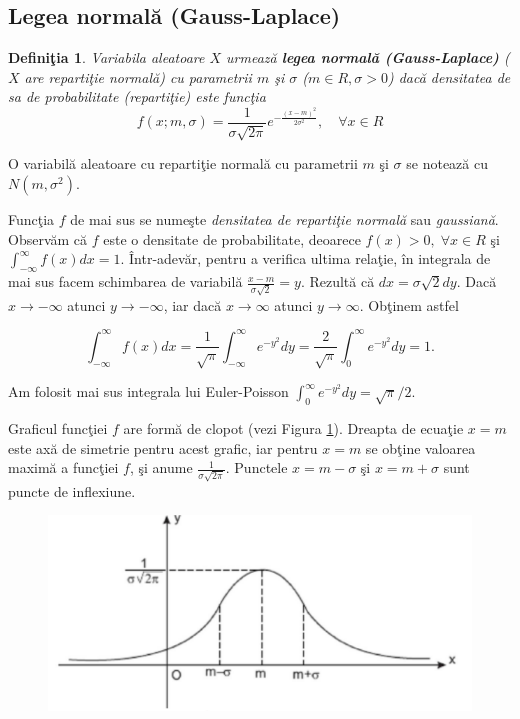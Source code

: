 \documentclass[12pt]{article}
\newtheorem{definitie}{Definiţia}
\begin{document}
\subsection*{Legea normală (Gauss-Laplace)}

\begin{definitie}
	Variabila aleatoare $X$ urmează \textbf{legea normală (Gauss-Laplace)} ($X$ are repartiţie normală) cu parametrii $m$ şi $\sigma$ ($m \in R, \sigma > 0$) dacă densitatea de sa de probabilitate (repartiţie) este funcţia
	\begin{equation}
		f(x;m, \sigma) = \frac{1}{\sigma\sqrt{2\pi}} e^{-\frac{(x-m)^2}{2\sigma^2}}, \quad \forall x \in R
	\end{equation}
\end{definitie}

O variabilă aleatoare cu repartiţie normală cu parametrii $m$ şi $\sigma$ se notează cu $N(m, \sigma^2)$.

Funcţia $f$ de mai sus se numeşte \textit{densitatea de repartiţie normală} sau \textit{gaussiană}. Observăm că $f$ este o densitate de probabilitate, deoarece $f(x) > 0, \; \forall x \in R$ şi $\int_{-\infty}^\infty f(x)dx = 1$. Într-adevăr, pentru a verifica ultima relaţie, în integrala de mai sus facem schimbarea de variabilă $\frac{x-m}{\sigma\sqrt{2}} = y$. Rezultă că $dx = \sigma\sqrt{2}dy$. Dacă $x \to -\infty$ atunci $y \to -\infty$, iar dacă $x \to \infty$ atunci $y \to \infty$. Obţinem astfel

\begin{equation*}
\int_{-\infty}^\infty f(x)dx = \frac{1}{\sqrt{\pi}} \int_{-\infty}^\infty e^{-y^2} dy = \frac{2}{\sqrt{\pi}} \int_0^\infty e^{-y^2} dy = 1.
\end{equation*}

\noindent Am folosit mai sus integrala lui Euler-Poisson $\int_0^\infty e^{-y^2}dy = \sqrt{\pi}/2$.


Graficul funcţiei $f$ are formă de clopot (vezi Figura \ref{fig:grafic}). Dreapta de ecuaţie $x=m$ este axă de simetrie pentru acest grafic, iar pentru $x=m$ se obţine valoarea maximă a funcţiei $f$, şi anume $\frac{1}{\sigma \sqrt{2\pi}}$. Punctele $x=m-\sigma$ şi $x=m+\sigma$ sunt puncte de inflexiune.

\begin{figure}
	\vspace{.2\paperheight}
	\begin{center}
	\includegraphics[width=.6\textwidth]{grafic}
	\end{center}
	\caption{\label{fig:grafic}} 
\end{figure}
\end{document}
